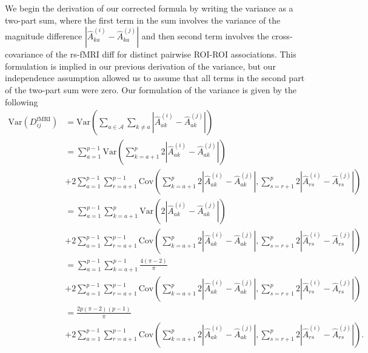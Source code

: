 \documentclass[aos]{imsart}
\begin{document}
We begin the derivation of our corrected formula by writing the variance as a two-part sum, where the first term in the sum involves the variance of the magnitude difference $|\hat{A}^{(i)}_{ka} - \hat{A}^{(j)}_{ka}|$ and then second term involves the cross-covariance of the rs-fMRI diff for distinct pairwise ROI-ROI associations. This formulation is implied in our previous derivation of the variance, but our independence assumption allowed us to assume that all terms in the second part of the two-part sum were zero. Our formulation of the variance is given by the following
%
\begin{equation}\label{eq:var_DDistr_rs-fMRI}
\begin{aligned}
\text{Var}(D^\text{fMRI}_{ij}) &= \text{Var}\left(\sum_{a \in \mathcal{A}} \sum_{k \neq a} \left|\hat{A}^{(i)}_{ak} - \hat{A}^{(j)}_{ak}\right|\right) \\
&= \sum_{a = 1}^{p-1} \text{Var}\left(\sum_{k=a+1}^{p} 2\left|\hat{A}^{(i)}_{ak} - \hat{A}^{(j)}_{ak}\right|\right) \\
&+ 2\sum_{a = 1}^{p-1} \sum_{r=a+1}^{p-1} \text{Cov}\left(\sum_{k=a+1}^{p} 2\left|\hat{A}^{(i)}_{ak} - \hat{A}^{(j)}_{ak}\right|, \sum_{s=r+1}^{p} 2\left|\hat{A}^{(i)}_{rs} - \hat{A}^{(j)}_{rs}\right|\right) \\
&= \sum_{a=1}^{p-1} \sum_{k=a+1}^{p} \text{Var}\left(2\left|\hat{A}^{(i)}_{ak} - \hat{A}^{(j)}_{ak}\right|\right) \\
&+ 2\sum_{a = 1}^{p-1} \sum_{r=a+1}^{p-1} \text{Cov}\left(\sum_{k=a+1}^{p} 2\left|\hat{A}^{(i)}_{ak} - \hat{A}^{(j)}_{ak}\right|, \sum_{s=r+1}^{p} 2\left|\hat{A}^{(i)}_{rs} - \hat{A}^{(j)}_{rs}\right|\right) \\
&= \sum_{a = 1}^{p-1} \sum_{k=a+1}^{p-1}\frac{4(\pi-2)}{\pi} \\
&+ 2\sum_{a = 1}^{p-1} \sum_{r=a+1}^{p-1} \text{Cov}\left(\sum_{k=a+1}^{p} 2\left|\hat{A}^{(i)}_{ak} - \hat{A}^{(j)}_{ak}\right|, \sum_{s=r+1}^{p} 2\left|\hat{A}^{(i)}_{rs} - \hat{A}^{(j)}_{rs}\right|\right) \\
&= \frac{2p(\pi-2)(p-1)}{\pi} \\
&+ 2\sum_{a = 1}^{p-1} \sum_{r=a+1}^{p-1} \text{Cov}\left(\sum_{k=a+1}^{p} 2\left|\hat{A}^{(i)}_{ak} - \hat{A}^{(j)}_{ak}\right|, \sum_{s=r+1}^{p} 2\left|\hat{A}^{(i)}_{rs} - \hat{A}^{(j)}_{rs}\right|\right).
\end{aligned}
\end{equation}
\end{document}
